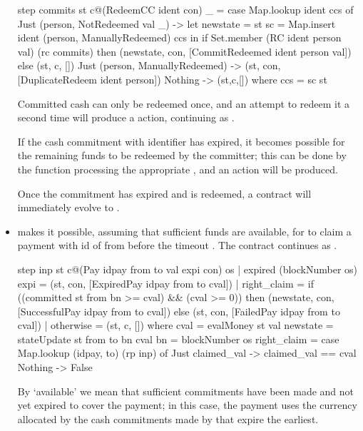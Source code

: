 \documentclass[runningheads]{llncs}
\begin{document}
\begin{itemize}
\begin{haskellcode}
step commits st c@(RedeemCC ident con) _ =
    case Map.lookup ident ccs of
      Just (person, NotRedeemed val _) ->
        let newstate = 
                st {sc = Map.insert ident (person, ManuallyRedeemed) ccs} in
        if Set.member (RC ident person val) (rc commits)
        then (newstate, con, [CommitRedeemed ident person val])
        else (st, c, [])
      Just (person, ManuallyRedeemed) ->
        (st, con, [DuplicateRedeem ident person])
      Nothing -> (st,c,[])
    where
        ccs = sc st
\end{haskellcode}
Committed cash can only be redeemed once, and an attempt to redeem it a second time will produce a  
 action, continuing as .

If the cash commitment with identifier  has expired, it becomes possible for the remaining funds 
to be redeemed by the committer; this can be done by the  function processing the appropriate 
, and an  action will be produced. 

Once the commitment  has expired and is redeemed, a  contract 
will 
immediately evolve to .

\medskip
\noindent
\item {} makes it possible, assuming that sufficient funds are available, 
for  to claim a payment with id  of  from 
 before the timeout . The contract continues as . 

\begin{haskellcode}
step inp st c@(Pay idpay from to val expi con) os
  | expired (blockNumber os) expi = (st, con, [ExpiredPay idpay from to cval])
  | right_claim =
    if ((committed st from bn >= cval) && (cval >= 0))
      then (newstate, con, [SuccessfulPay idpay from to cval])
      else (st, con, [FailedPay idpay from to cval])
  | otherwise = (st, c, [])
  where
    cval = evalMoney st val
    newstate = stateUpdate st from to bn cval
    bn = blockNumber os
    right_claim =
      case Map.lookup (idpay, to) (rp inp) of
        Just claimed_val -> claimed_val == cval
        Nothing -> False
\end{haskellcode}
By `available' we mean that sufficient commitments have been made and not yet expired to cover the payment; in this 
case, the payment uses the currency allocated by the cash commitments made by  that expire the 
earliest.


\end{itemize}
\end{document}
